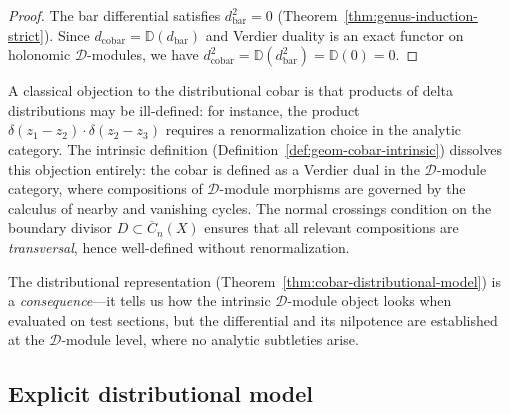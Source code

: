\begin{proof}
The bar differential satisfies $d_{\mathrm{bar}}^2 = 0$
(Theorem~\ref{thm:genus-induction-strict}).  Since
$d_{\mathrm{cobar}} = \mathbb{D}(d_{\mathrm{bar}})$ and Verdier duality is
an exact functor on holonomic $\mathcal{D}$-modules, we have
$d_{\mathrm{cobar}}^2 = \mathbb{D}(d_{\mathrm{bar}}^2) = \mathbb{D}(0) = 0$.
\end{proof}

\begin{remark}\label{rem:delta-product-resolution}
A classical objection to the distributional cobar is that products of delta
distributions may be ill-defined: for instance, the product
$\delta(z_1 - z_2) \cdot \delta(z_2 - z_3)$ requires a renormalization
choice in the analytic category.  The intrinsic
definition (Definition~\ref{def:geom-cobar-intrinsic}) dissolves this
objection entirely: the cobar is defined as a Verdier dual in the
$\mathcal{D}$-module category, where compositions of $\mathcal{D}$-module
morphisms are governed by the calculus of nearby and vanishing cycles.  The
normal crossings condition on the boundary divisor $D \subset
\overline{C}_n(X)$ ensures that all relevant compositions are
\emph{transversal}, hence well-defined without renormalization.

The distributional representation
(Theorem~\ref{thm:cobar-distributional-model}) is a \emph{consequence}---it
tells us how the intrinsic $\mathcal{D}$-module object looks when evaluated
on test sections, but the differential and its nilpotence are established at
the $\mathcal{D}$-module level, where no analytic subtleties arise.
\end{remark}


\subsection{Explicit distributional model}\label{subsec:distributional-model}

